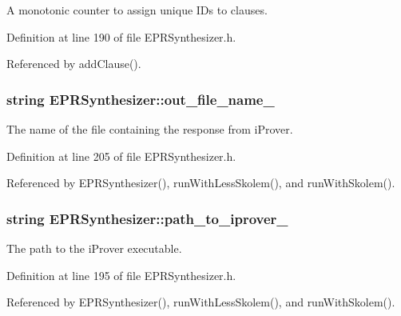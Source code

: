 A monotonic counter to assign unique I\-Ds to clauses. 



Definition at line 190 of file E\-P\-R\-Synthesizer.\-h.



Referenced by add\-Clause().

\hypertarget{classEPRSynthesizer_a40ca45e5284a5c24964730beb17d76b8}{
\subsubsection[{out\-\_\-file\-\_\-name\-\_\-}]{\setlength{\rightskip}{0pt plus 5cm}string E\-P\-R\-Synthesizer\-::out\-\_\-file\-\_\-name\-\_\-\hspace{0.3cm}{\ttfamily [protected]}}}\label{classEPRSynthesizer_a40ca45e5284a5c24964730beb17d76b8}


The name of the file containing the response from i\-Prover. 



Definition at line 205 of file E\-P\-R\-Synthesizer.\-h.



Referenced by E\-P\-R\-Synthesizer(), run\-With\-Less\-Skolem(), and run\-With\-Skolem().

\hypertarget{classEPRSynthesizer_ac7fc7beb51f9c27e42941e8e20882540}{
\subsubsection[{path\-\_\-to\-\_\-iprover\-\_\-}]{\setlength{\rightskip}{0pt plus 5cm}string E\-P\-R\-Synthesizer\-::path\-\_\-to\-\_\-iprover\-\_\-\hspace{0.3cm}{\ttfamily [protected]}}}\label{classEPRSynthesizer_ac7fc7beb51f9c27e42941e8e20882540}


The path to the i\-Prover executable. 



Definition at line 195 of file E\-P\-R\-Synthesizer.\-h.



Referenced by E\-P\-R\-Synthesizer(), run\-With\-Less\-Skolem(), and run\-With\-Skolem().

